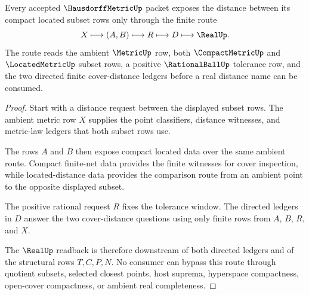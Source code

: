 \begin{theorem}
\label{thm:hausdorff-metric-compact-subset-distance-route}
Every accepted $\HausdorffMetricUp$ packet exposes the distance between its compact located subset rows only through the finite route
$$
X\longmapsto (A,B)\longmapsto R\longmapsto D\longmapsto \RealUp .
$$
The route reads the ambient $\MetricUp$ row, both $\CompactMetricUp$ and $\LocatedMetricUp$ subset rows, a positive $\RationalBallUp$ tolerance row, and the two directed finite cover-distance ledgers before a real distance name can be consumed.
\end{theorem}
\begin{proof}
Start with a distance request between the displayed subset rows. The ambient metric row $X$ supplies the point classifiers, distance witnesses, and metric-law ledgers that both subset rows use.

The rows $A$ and $B$ then expose compact located data over the same ambient route. Compact finite-net data provides the finite witnesses for cover inspection, while located-distance data provides the comparison route from an ambient point to the opposite displayed subset.

The positive rational request $R$ fixes the tolerance window. The directed ledgers in $D$ answer the two cover-distance questions using only finite rows from $A$, $B$, $R$, and $X$.

The $\RealUp$ readback is therefore downstream of both directed ledgers and of the structural rows $T,C,P,N$. No consumer can bypass this route through quotient subsets, selected closest points, host suprema, hyperspace compactness, open-cover compactness, or ambient real completeness.
\end{proof}


